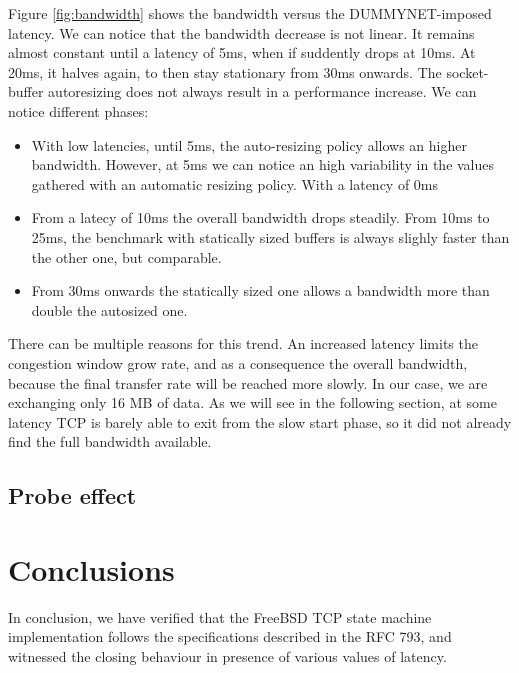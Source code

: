 \documentclass[a4paper,10pt]{article}
\begin{document}
Figure \ref{fig:bandwidth} shows the bandwidth versus the DUMMYNET-imposed latency. We can notice that the bandwidth decrease is not linear. It remains almost constant until a latency of 5ms, when if suddently drops at 10ms. At 20ms, it halves again, to then stay stationary from 30ms onwards.
The socket-buffer autoresizing does not always result in a performance increase. We can notice different phases:
\begin{itemize}
   \item With low latencies, until 5ms, the auto-resizing policy allows an higher bandwidth. However, at 5ms we can notice an high variability in the values gathered with an automatic resizing policy.  With a latency of 0ms %
      
   \item From a latecy of 10ms the overall bandwidth drops steadily. From 10ms to 25ms, the benchmark with statically sized buffers is always slighly faster than the other one, but comparable.
   \item From 30ms onwards the statically sized one allows a bandwidth more than double the autosized one. %
\end{itemize}

There can be multiple reasons for this trend. 
An increased latency limits the congestion window grow rate, and as a consequence the overall bandwidth, because the final transfer rate will be reached more slowly. In our case, we are exchanging only 16 MB of data. As we will see in the following section, at some latency TCP is barely able to exit from the slow start phase, so it did not already find the full bandwidth available.



\subsection{Probe effect}

\section{Conclusions}

In conclusion, we have verified that the FreeBSD TCP state machine implementation follows the specifications described in the RFC 793\cite{postel_transmission_nodate}, and witnessed the closing behaviour in presence of various values of latency.
\end{document}
